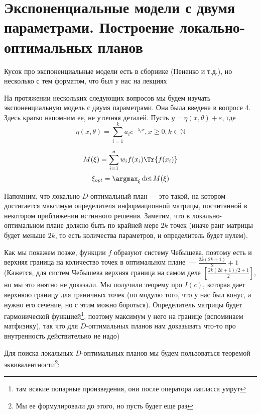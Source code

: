 \section{Экспоненциальные модели с двумя параметрами. Построение локально-оптимальных планов}

{\color{blue} Кусок про экспоненциальные модели есть в сборнике (Пененко и т.д.), но несколько  с тем форматом, что был у нас на лекциях}

На протяжении нескольких следующих вопросов мы будем изучать экспоненциальную модель с двумя параметрами.
Она была введена в вопросе 4. Здесь кратко напомним ее, не уточняя деталей.
Пусть $y = \eta(x, \theta) + \varepsilon$, где 
$$\eta(x,\theta) = \sum\limits_{i=1}^{k} a_i e^{-\lambda_ix}, x \ge 0, k \in \mathbb{N}$$

$$M(\xi) = \sum \limits_{i=1}^{n} w_if(x_i)\Tr{f(x_i)}$$
$$\xi_{opt} = \argmax_{\xi} \det M(\xi)$$

Напомним, что локально-$D$-оптимальный план --- это такой, на котором достигается максимум определителя информационной матрицы, посчитанной в некотором приближении истинного решения.
Заметим, что в локально-оптимальном плане должно быть по крайней мере $2k$ точек (иначе ранг матрицы будет меньше $2k$, то есть количества параметров, и определитель будет нулем). 

Как мы покажем позже, функции $f$ образуют систему Чебышева, поэтому есть и верхняя граница на количество точек в оптимальном плане — $\frac{2k(2k+1)}{2}+1$ (Кажется, для систем Чебышева верхняя граница на самом деле $[\frac{2k(2k+1)/2 + 1}{2}]$, но мы это внятно не доказали. Мы получили теорему про $I(c)$, которая дает верхнюю границу для граничных точек (по модулю того, что у нас был конус, а нужно его сечение, но с этим можно бороться). Определитель матрицы будет гармонической функцией\footnote{там всякие попарные произведения, они после оператора лапласса умрут}, поэтому максимум у него на границе (вспоминаем матфизику), так что для $D$-оптимальных планов нам доказывать что-то про внутренность действительно не надо)


Для поиска локальных $D$-оптимальных планов мы будем пользоваться теоремой эквивалентности\footnote{Мы ее формулировали до этого, но пусть будет еще раз}:

